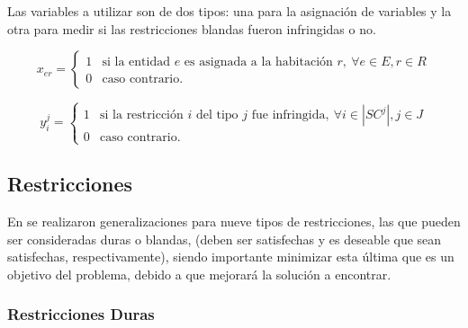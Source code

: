 \documentclass[letter, 10pt]{article}
\begin{document}
Las variables a utilizar son de dos tipos: una para la asignaci\'on de variables y la otra para medir si las restricciones blandas fueron infringidas o no.

$$
x_{er} = \left\{
\begin{array}{cl}
1 & \mbox{si la entidad } e \mbox{ es asignada a la habitaci\'on } r, \ \forall e \in E, r \in R\\
0&\mbox{caso contrario}.
\end{array}\right.
$$

$$
y_{i}^j = \left\{
\begin{array}{cl}
1 & \mbox{si la restricci\'on } i \mbox{ del tipo } j \mbox{ fue infringida}, \ \forall i \in |SC^j|, j \in J\\
0&\mbox{caso contrario}.
\end{array}\right.
$$

\subsection{Restricciones}
En \cite{USM} se realizaron generalizaciones para nueve tipos de restricciones, las que pueden ser consideradas duras o blandas, (deben ser satisfechas y es deseable que sean satisfechas, respectivamente), siendo importante minimizar esta \'ultima que es un objetivo del problema, debido a que mejorar\'a la soluci\'on a encontrar.
\subsubsection{Restricciones Duras}
\end{document}
